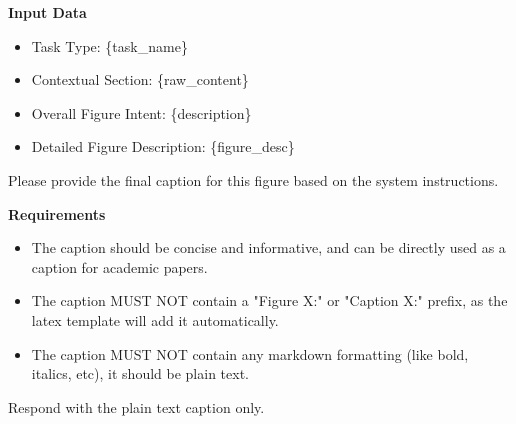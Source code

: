 \noindent\textbf{Input Data}
\begin{itemize}
    \item Task Type: \{task\_name\}
    \item Contextual Section: \{raw\_content\}
    \item Overall Figure Intent: \{description\}
    \item Detailed Figure Description: \{figure\_desc\}
\end{itemize}

\noindent Please provide the final caption for this figure based on the system instructions.

\vspace{1em}
\noindent\textbf{Requirements}
\begin{itemize}
    \item The caption should be concise and informative, and can be directly used as a caption for academic papers.
    \item The caption MUST NOT contain a "Figure X:" or "Caption X:" prefix, as the latex template will add it automatically.
    \item The caption MUST NOT contain any markdown formatting (like bold, italics, etc), it should be plain text.
\end{itemize}

\vspace{0.5em}
\noindent Respond with the plain text caption only.